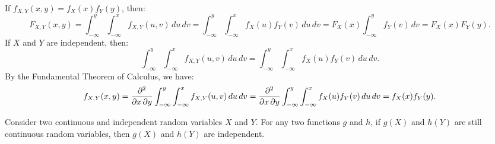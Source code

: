 \documentclass{huhtakm-template-book-v2}
\begin{document}
    \begin{proofing}
        If $f_{X,Y}(x, y) = f_{X}(x)f_{Y}(y)$, then:
        \begin{equation*}
            F_{X,Y}(x, y) = \int_{-\infty}^{y}\int_{-\infty}^{x}f_{X,Y}(u, v)\,du\,dv = \int_{-\infty}^{y}\int_{-\infty}^{x}f_{X}(u)f_{Y}(v)\,du\,dv = F_{X}(x)\int_{-\infty}^{y}f_{Y}(v)\,dv = F_{X}(x)F_{Y}(y).
        \end{equation*}
        If $X$ and $Y$ are independent, then:
        \begin{equation*}
            \int_{-\infty}^{y}\int_{-\infty}^{x}f_{X,Y}(u, v)\,du\,dv = \int_{-\infty}^{y}\int_{-\infty}^{x}f_{X}(u)f_{Y}(v)\,du\,dv.
        \end{equation*}
        By the Fundamental Theorem of Calculus, we have:
        \begin{equation*}
            f_{X,Y}(x, y) = \pdv*{}{x,y}\int_{-\infty}^{y}\int_{-\infty}^{x}f_{X,Y}(u, v)\,du\,dv = \pdv*{}{x,y}\int_{-\infty}^{y}\int_{-\infty}^{x}f_{X}(u)f_{Y}(v)\,du\,dv = f_{X}(x)f_{Y}(y).
        \end{equation*}
    \end{proofing}
    \begin{thm}
        Consider two continuous and independent random variables $X$ and $Y$. For any two functions $g$ and $h$, if $g(X)$ and $h(Y)$ are still continuous random variables, then $g(X)$ and $h(Y)$ are independent.
    \end{thm}
    \newpage
\end{document}

